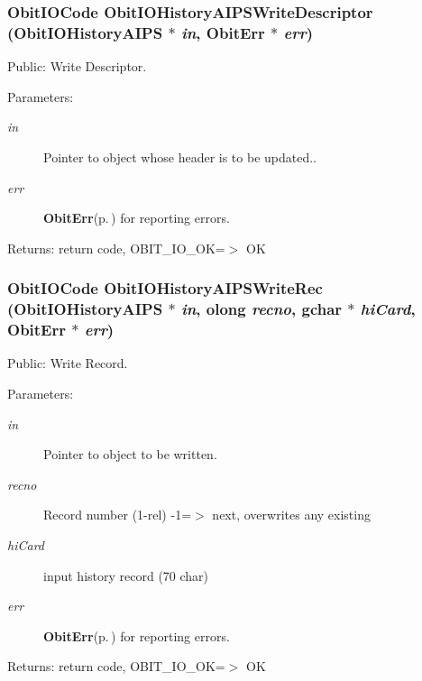 \subsubsection{\setlength{\rightskip}{0pt plus 5cm}Obit\-IOCode Obit\-IOHistory\-AIPSWrite\-Descriptor ({\bf Obit\-IOHistory\-AIPS} $\ast$ {\em in}, {\bf Obit\-Err} $\ast$ {\em err})}\label{ObitIOHistoryAIPS_8c_a22}


Public: Write Descriptor. 

\begin{Desc}
\item[Parameters:]
\begin{description}
\item[{\em in}]Pointer to object whose header is to be updated.. \item[{\em err}]{\bf Obit\-Err}{\rm (p.\,\pageref{structObitErr})} for reporting errors. \end{description}
\end{Desc}
\begin{Desc}
\item[Returns:]return code, OBIT\_\-IO\_\-OK=$>$ OK \end{Desc}
\subsubsection{\setlength{\rightskip}{0pt plus 5cm}Obit\-IOCode Obit\-IOHistory\-AIPSWrite\-Rec ({\bf Obit\-IOHistory\-AIPS} $\ast$ {\em in}, {\bf olong} {\em recno}, gchar $\ast$ {\em hi\-Card}, {\bf Obit\-Err} $\ast$ {\em err})}\label{ObitIOHistoryAIPS_8c_a19}


Public: Write Record. 

\begin{Desc}
\item[Parameters:]
\begin{description}
\item[{\em in}]Pointer to object to be written. \item[{\em recno}]Record number (1-rel) -1=$>$ next, overwrites any existing \item[{\em hi\-Card}]input history record (70 char) \item[{\em err}]{\bf Obit\-Err}{\rm (p.\,\pageref{structObitErr})} for reporting errors. \end{description}
\end{Desc}
\begin{Desc}
\item[Returns:]return code, OBIT\_\-IO\_\-OK=$>$ OK \end{Desc}
